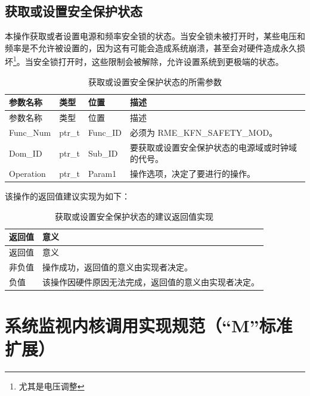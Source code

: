 \subsection{获取或设置安全保护状态}\label{subsec:8-get-or-set-safety-protection-state}

本操作获取或者设置电源和频率安全锁的状态。当安全锁未被打开时，某些电压和频率是不允许被设置的，因为这有可能会造成系统崩溃，甚至会对硬件造成永久损坏\footnote{尤其是电压调整}。当安全锁打开时，这些限制会被解除，允许设置系统到更极端的状态。

\begin{xltabular}{\textwidth}{@{}>{\hsize\raggedright\arraybackslash}X>{\hsize\raggedright\arraybackslash}X>{\hsize\raggedright\arraybackslash}X>{\hsize\raggedright\arraybackslash}X@{}}
\caption{获取或设置安全保护状态的所需参数}\label{tab:8-55-get-or-set-safety-protection-state-parameters}\\
\toprule
参数名称 & 类型 & 位置 & 描述\tabularnewline
\endfirsthead
\toprule
参数名称 & 类型 & 位置 & 描述\tabularnewline
\midrule
\endhead
\bottomrule
\endlastfoot
Func\_Num & ptr\_t & Func\_ID & 必须为 RME\_KFN\_SAFETY\_MOD。\tabularnewline
Dom\_ID & ptr\_t & Sub\_ID &
要获取或设置安全保护状态的电源域或时钟域的代号。\tabularnewline
Operation & ptr\_t & Param1 &
操作选项，决定了要进行的操作。\tabularnewline
\end{xltabular}

该操作的返回值建议实现为如下：

\begin{xltabular}{\textwidth}{@{}>{\hsize\raggedright\arraybackslash}X>{\hsize\raggedright\arraybackslash}X@{}}
\caption{获取或设置安全保护状态的建议返回值实现}\label{tab:8-56-get-or-set-safety-protection-state-suggested-return-values}\\
\toprule
返回值 & 意义\tabularnewline
\endfirsthead
\toprule
返回值 & 意义\tabularnewline
\midrule
\endhead
\bottomrule
\endlastfoot
    非负值 & 操作成功，返回值的意义由实现者决定。\tabularnewline
    负值 & 该操作因硬件原因无法完成，返回值的意义由实现者决定。\tabularnewline
\end{xltabular}

\section{系统监视内核调用实现规范（``M''标准扩展）}\label{sec:8-system-monitor-kernel-calls}
\nopagebreak[4]

